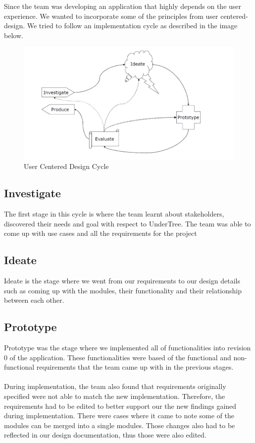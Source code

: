 \documentclass{article}
\begin{document}
	Since the team was developing an application that highly depends on the user experience. We wanted to incorporate some of the principles from user centered-design. We tried to follow an implementation cycle as described in the image below. \\
	
	\begin{figure}[H]
		\centering
		\includegraphics[scale=0.7]{ucd.png}
		\caption{User Centered Design Cycle}
	\end{figure}
	
	\subsection{Investigate}
	The first stage in this cycle is where the team learnt about stakeholders, discovered their needs and goal with respect to UnderTree. The team was able to come up with use cases and all the requirements for the project
	\subsection{Ideate}
	Ideate is the stage where we went from our requirements to our design details such as coming up with the modules, their functionality and their relationship between each other.
	\subsection{Prototype}
	Prototype was the stage where we implemented all of functionalities into revision 0 of the application. These functionalities were based of the functional and non-functional requirements that the team came up with in the previous stages. \\\\
	During implementation, the team also found that requirements originally specified were not able to match the new implementation. Therefore, the requirements had to be edited to better support our the new findings gained during implementation. There were cases where it came to note some of the modules can be merged into a single modules. Those changes also had to be reflected in our design documentation, thus those were also edited.
\end{document}
